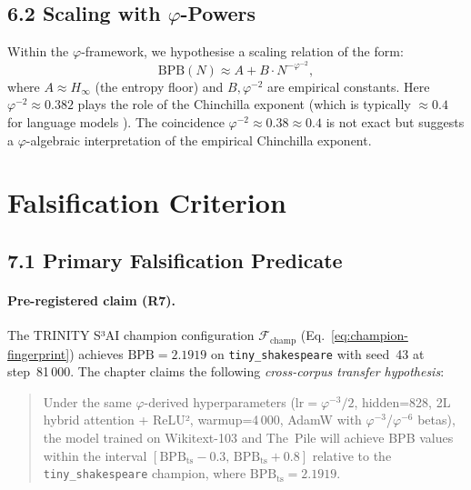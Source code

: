 \subsection{6.2 Scaling with $\varphi$-Powers}
\label{subsec:ch25-phi-scaling}

Within the $\varphi$-framework, we hypothesise a scaling relation
of the form:
\begin{equation}
  \mathrm{BPB}(N) \approx A + B \cdot N^{-\varphi^{-2}},
  \label{eq:phi-scaling}
\end{equation}
where $A \approx H_\infty$ (the entropy floor) and $B, \varphi^{-2}$
are empirical constants.  Here $\varphi^{-2} \approx 0.382$ plays
the role of the Chinchilla exponent (which is typically $\approx 0.4$
for language models \citep{hoffmann_chinchilla_2022}).  The
coincidence $\varphi^{-2} \approx 0.38 \approx 0.4$ is not exact
but suggests a $\varphi$-algebraic interpretation of the empirical
Chinchilla exponent.

\section{Falsification Criterion}
\label{sec:ch25-falsification}

\subsection{7.1 Primary Falsification Predicate}
\label{subsec:ch25-falsify-primary}

\paragraph{Pre-registered claim (R7).}
The TRINITY S³AI champion configuration
$\mathcal{F}_{\mathrm{champ}}$ (Eq.~\ref{eq:champion-fingerprint})
achieves $\mathrm{BPB} = 2.1919$ on \texttt{tiny\_shakespeare}
with seed~43 at step~81\,000.  The chapter claims the following
\emph{cross-corpus transfer hypothesis}:

\begin{quote}
  Under the same $\varphi$-derived hyperparameters
  ($\mathrm{lr} = \varphi^{-3}/2$, hidden=828, 2L hybrid attention + ReLU²,
  warmup=4\,000, AdamW with $\varphi^{-3}$/$\varphi^{-6}$ betas),
  the model trained on Wikitext-103 \citep{merity_wikitext_2016} and
  The~Pile \citep{gao_pile_2020} will achieve BPB values within
  the interval $[\mathrm{BPB}_{\mathrm{ts}} - 0.3,\,
  \mathrm{BPB}_{\mathrm{ts}} + 0.8]$ relative to the
  \texttt{tiny\_shakespeare} champion, where $\mathrm{BPB}_{\mathrm{ts}}
  = 2.1919$.
\end{quote}

